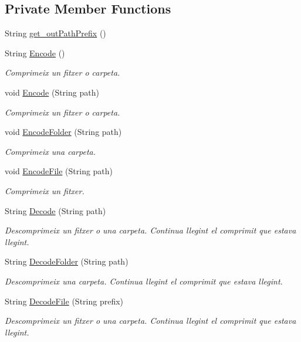 \subsection*{Private Member Functions}
\begin{DoxyCompactItemize}
\item 
String \hyperlink{classdomini_1_1folders_1_1Ctrl__FolderFile_a11c6b1b4a25d12b8091c7c96b3da1ea7}{get\+\_\+out\+Path\+Prefix} ()
\item 
String \hyperlink{classdomini_1_1folders_1_1Ctrl__FolderFile_a7c47fd5127ae6f713a4fa7f75002a6f6}{Encode} ()
\begin{DoxyCompactList}\small\item\em Comprimeix un fitxer o carpeta. \end{DoxyCompactList}\item 
void \hyperlink{classdomini_1_1folders_1_1Ctrl__FolderFile_ac2cb74a86677ce947b403cc63b91e874}{Encode} (String path)
\begin{DoxyCompactList}\small\item\em Comprimeix un fitxer o carpeta. \end{DoxyCompactList}\item 
void \hyperlink{classdomini_1_1folders_1_1Ctrl__FolderFile_a6b18175639009f0186307710fb88a18f}{Encode\+Folder} (String path)
\begin{DoxyCompactList}\small\item\em Comprimeix una carpeta. \end{DoxyCompactList}\item 
void \hyperlink{classdomini_1_1folders_1_1Ctrl__FolderFile_a0b2b642b6c23124539d0306955be7f0c}{Encode\+File} (String path)
\begin{DoxyCompactList}\small\item\em Comprimeix un fitxer. \end{DoxyCompactList}\item 
String \hyperlink{classdomini_1_1folders_1_1Ctrl__FolderFile_ababd536f11319589ce3c371e3701afc6}{Decode} (String path)
\begin{DoxyCompactList}\small\item\em Descomprimeix un fitxer o una carpeta. Continua llegint el comprimit que estava llegint. \end{DoxyCompactList}\item 
String \hyperlink{classdomini_1_1folders_1_1Ctrl__FolderFile_ae8f46feaced983c27c6537794f823dd8}{Decode\+Folder} (String path)
\begin{DoxyCompactList}\small\item\em Descomprimeix una carpeta. Continua llegint el comprimit que estava llegint. \end{DoxyCompactList}\item 
String \hyperlink{classdomini_1_1folders_1_1Ctrl__FolderFile_aa12178fff5fbb832759b7328cbdb4415}{Decode\+File} (String prefix)
\begin{DoxyCompactList}\small\item\em Descomprimeix un fitxer o una carpeta. Continua llegint el comprimit que estava llegint. \end{DoxyCompactList}\end{DoxyCompactItemize}
